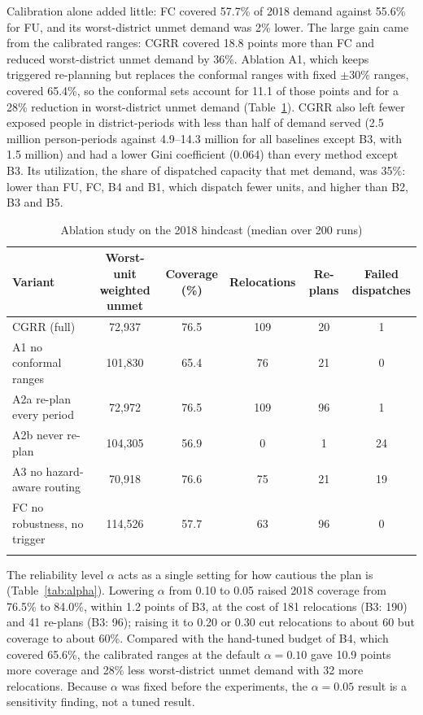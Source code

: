 \documentclass[pdflatex,sn-basic]{sn-jnl}
\theoremstyle{plain}%
\theoremstyle{remark}%
\theoremstyle{definition}%
\begin{document}
Calibration alone added little: FC covered 57.7\% of 2018 demand against 55.6\% for FU, and its worst-district unmet demand was 2\% lower. The large gain came from the calibrated ranges: CGRR covered 18.8 points more than FC and reduced worst-district unmet demand by 36\%. Ablation A1, which keeps triggered re-planning but replaces the conformal ranges with fixed $\pm 30\%$ ranges, covered 65.4\%, so the conformal sets account for 11.1 of those points and for a 28\% reduction in worst-district unmet demand (Table~\ref{tab:ablation}). CGRR also left fewer exposed people in district-periods with less than half of demand served (2.5 million person-periods against 4.9--14.3 million for all baselines except B3, with 1.5 million) and had a lower Gini coefficient (0.064) than every method except B3. Its utilization, the share of dispatched capacity that met demand, was 35\%: lower than FU, FC, B4 and B1, which dispatch fewer units, and higher than B2, B3 and B5.

\begin{table}[h]
\caption{Ablation study on the 2018 hindcast (median over 200 runs)}\label{tab:ablation}
\footnotesize
\begin{tabular*}{\textwidth}{@{\extracolsep\fill}lccccc}
\toprule
Variant & \makecell{Worst-unit\\weighted unmet} & \makecell{Coverage\\(\%)} & Relocations & Re-plans & \makecell{Failed\\dispatches} \\
\midrule
CGRR (full) & 72,937 & 76.5 & 109 & 20 & 1 \\
A1 no conformal ranges & 101,830 & 65.4 & 76 & 21 & 0 \\
A2a re-plan every period & 72,972 & 76.5 & 109 & 96 & 1 \\
A2b never re-plan & 104,305 & 56.9 & 0 & 1 & 24 \\
A3 no hazard-aware routing & 70,918 & 76.6 & 75 & 21 & 19 \\
FC no robustness, no trigger & 114,526 & 57.7 & 63 & 96 & 0 \\
\botrule
\end{tabular*}
\end{table}


The reliability level $\alpha$ acts as a single setting for how cautious the plan is (Table~\ref{tab:alpha}). Lowering $\alpha$ from 0.10 to 0.05 raised 2018 coverage from 76.5\% to 84.0\%, within 1.2 points of B3, at the cost of 181 relocations (B3: 190) and 41 re-plans (B3: 96); raising it to 0.20 or 0.30 cut relocations to about 60 but coverage to about 60\%. Compared with the hand-tuned budget of B4, which covered 65.6\%, the calibrated ranges at the default $\alpha = 0.10$ gave 10.9 points more coverage and 28\% less worst-district unmet demand with 32 more relocations. Because $\alpha$ was fixed before the experiments, the $\alpha = 0.05$ result is a sensitivity finding, not a tuned result.
\end{document}
